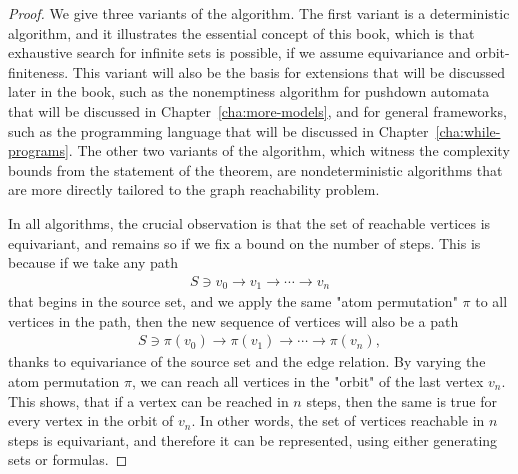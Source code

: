 \begin{proof}
We give three variants of the algorithm. The first variant is a deterministic algorithm, and it illustrates the essential concept of this book, which is that exhaustive search for infinite sets is possible, if we assume equivariance and orbit-finiteness. This variant will also be the basis for extensions that will be discussed later in the book, such as the nonemptiness algorithm for pushdown automata that will be discussed in Chapter~\ref{cha:more-models}, and for general frameworks, such as the programming language that will be discussed in Chapter~\ref{cha:while-programs}. The other two variants of the algorithm, which witness the complexity bounds from the statement of the theorem, are nondeterministic algorithms that are more directly tailored to the graph reachability problem. 

In all algorithms, the crucial  observation  is that   the set of reachable vertices  is equivariant, and remains so if we fix a bound on the number of steps. This is because if we take any path 
\begin{align*}
S \ni v_0  \to v_1 \to \cdots \to v_n
\end{align*}
that begins in the source set, 
and we apply the same  "atom permutation" $\pi$ to all  vertices in the path, then the new sequence of vertices will also be a path
\begin{align*}
S \ni \pi(v_0) \to \pi(v_1) \to \cdots \to \pi(v_n),
\end{align*}
thanks to equivariance of the source set and the edge relation. By varying the atom permutation $\pi$, we can reach all vertices in the "orbit" of the last vertex $v_n$. This shows, that if a vertex can be reached in $n$ steps, then  the same is true for every vertex in the orbit of $v_n$. In other words, the set of vertices reachable in $n$ steps is equivariant, and therefore it can be represented, using either generating sets or formulas. 


\end{proof}
